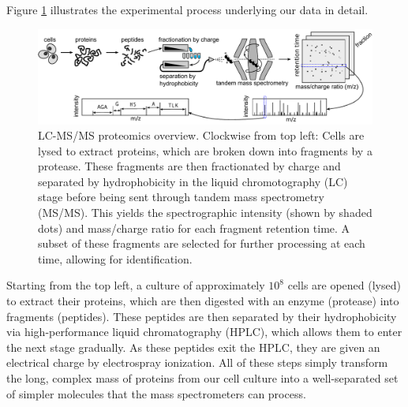 Figure \ref{proteomics:fig:Mass_Spec_Overview} illustrates the experimental process underlying our data in detail.
%
\begin{figure}[t]
 \centering
 \includegraphics[width=\textwidth]{figures/proteomics/mass-spec-errors-awb}
 \caption{LC-MS/MS proteomics overview. 
 Clockwise from top left: Cells are lysed to extract proteins, which are broken down into fragments by a protease.
These fragments are then fractionated by charge and separated by hydrophobicity in the liquid chromotography (LC) stage before being sent through tandem mass spectrometry (MS/MS).
This yields the spectrographic intensity (shown by shaded dots) and mass/charge ratio for each fragment retention time.
A subset of these fragments are selected for further processing at each time, allowing for identification.
\label{proteomics:fig:Mass_Spec_Overview}}
\end{figure}
%
Starting from the top left, a culture of approximately $10^{8}$ cells are opened (lysed) to extract their proteins, which are then digested with an enzyme (protease) into fragments (peptides).
These peptides are then separated by their hydrophobicity via high-performance liquid chromatography (HPLC), which allows them to enter the next stage gradually.
As these peptides exit the HPLC, they are given an electrical charge by electrospray ionization.
All of these steps simply transform the long, complex mass of proteins from our cell culture into a well-separated set of simpler molecules that the mass spectrometers can process.

